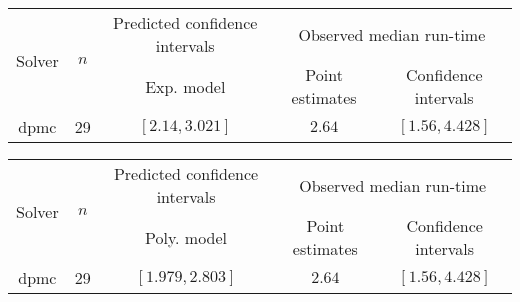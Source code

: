 \begin{tabular}{ccccc}
\hline 
\multirow{2}{*}{Solver} & \multirow{2}{*}{$n$} & Predicted confidence intervals & \multicolumn{2}{c}{Observed median  run-time}\tabularnewline
 &  & Exp. model  & Point estimates  & Confidence intervals\tabularnewline
\hline 
\hline 
\multirow{0}{*}{dpmc} & 29 & $\mathbf{\left[2.14,3.021\right]}$ & $2.64$ & $\left[1.56,4.428\right]$ \tabularnewline 
\hline 
\end{tabular} 

\begin{tabular}{ccccc}
\hline 
\multirow{2}{*}{Solver} & \multirow{2}{*}{$n$} & Predicted confidence intervals & \multicolumn{2}{c}{Observed median  run-time}\tabularnewline
 &  & Poly. model  & Point estimates  & Confidence intervals\tabularnewline
\hline 
\hline 
\multirow{0}{*}{dpmc} & 29 & $\mathbf{\left[1.979,2.803\right]}$ & $2.64$ & $\left[1.56,4.428\right]$ \tabularnewline 
\hline 
\end{tabular} 


